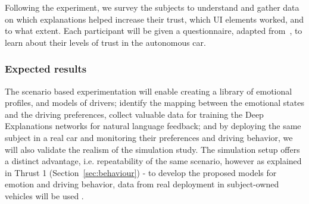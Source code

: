 Following the experiment, we survey the subjects to understand and gather data on which explanations helped increase their trust, which UI elements worked, and to what extent.
Each participant will be given a questionnaire, adapted from~\cite{merritt2013trust}, to learn about their levels of trust in the autonomous car. 
\vspace{-5pt}
\subsubsection{Expected results} 
The scenario based experimentation will enable creating a library of emotional profiles, and models of drivers; identify the mapping between the emotional states and the driving preferences, collect valuable data for training the Deep Explanations networks for natural language feedback; and by deploying the same subject in a real car and monitoring their preferences and driving behavior, we will also validate the realism of the simulation study. 
The simulation setup offers a distinct advantage, i.e. repeatability of the same scenario, however as explained in Thrust 1 (Section~\ref{sec:behaviour}) - to develop the proposed models for emotion and driving behavior, data from real deployment in subject-owned vehicles will be used . 


